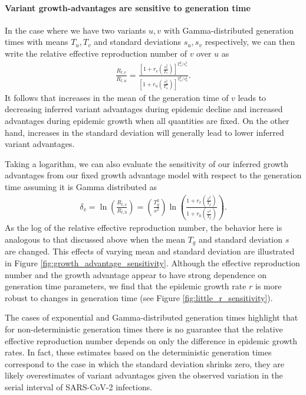 \paragraph{Variant growth-advantages are sensitive to generation time}%

In the case where we have two variants $u, v$ with Gamma-distributed generation times with means $T_{u}, T_{v}$ and standard deviations $s_{u}, s_{v}$ respectively, we can then write the relative effective reproduction number of $v$ over $u$ as
\begin{align*}
\frac{R_{t,v}}{R_{t,u}} = \frac{\left[1 + r_{v}  \left(\frac{s_{v}^{2}}{T_{v}}\right)\right]^{T_{v}^{2} / s_{v}^{2}}}{\left[1 + r_{u} \left(\frac{s_{u}^{2}}{T_{u}}\right)\right]^{T_{u}^{2} / s_{u}^{2}}}.
\end{align*}
It follows that increases in the mean of the generation time of $v$ leads to decreasing inferred variant advantages during epidemic decline and increased advantages during epidemic growth when all quantities are fixed.
On the other hand, increases in the standard deviation will generally lead to lower inferred variant advantages.

Taking a logarithm, we can also evaluate the sensitivity of our inferred growth advantages from our fixed growth advantage model with respect to the generation time assuming it is Gamma distributed as
\begin{align*}
 \delta_{v}  = \ln \left( \frac{R_{t,v}}{R_{t,0}} \right) = \left( \frac{T_{g}^{2}}{s^{2}} \right)  \ln \left( \frac{1 + r_{v}  \left(\frac{s^{2}}{T_{g}}\right)}{1 + r_{0} \left(\frac{s^{2}}{T_{g}}\right) } \right).
\end{align*}
As the log of the relative effective reproduction number, the behavior here is analogous to that discussed above when the mean $T_{g}$ and standard deviation $s$ are changed.
This effects of varying mean and standard deviation are illustrated in Figure \ref{fig:growth_advantage_sensitivity}.
Although the effective reproduction number and the growth advantage appear to have strong dependence on generation time parameters, we find that the epidemic growth rate $r$ is more robust to changes in generation time (see Figure \ref{fig:little_r_sensitivity}).

The cases of exponential and Gamma-distributed generation times highlight that for non-deterministic generation times there is no guarantee that the relative effective reproduction number depends on only the difference in epidemic growth rates.
In fact, these estimates based on the deterministic generation times correspond to the case in which the standard deviation shrinks zero, they are likely overestimates of variant advantages given the observed variation in the serial interval of SARS-CoV-2 infections.

